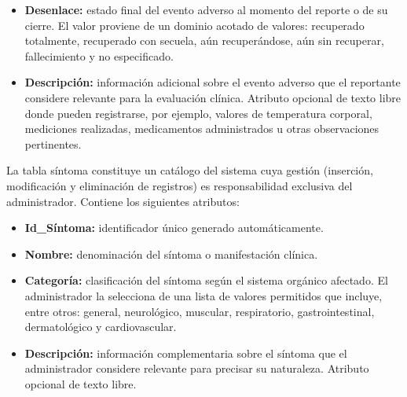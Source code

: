 \begin{itemize}
        \begin{itemize}
            \item Requirió visita médica.
            \item Requirió atención en servicios de emergencia.
            \item Requirió hospitalización.
            \item Provocó incapacidad temporal.
            \item Provocó la muerte del sujeto (en cuyo caso debe registrarse la fecha de fallecimiento).
            \item Provocó una anomalía congénita posiblemente relacionada con la vacunación.
        \end{itemize}
    \item \textbf{Desenlace:} estado final del evento adverso al momento del reporte o de su cierre. El valor proviene de un dominio acotado de valores: recuperado totalmente, recuperado con secuela, aún recuperándose, aún sin recuperar, fallecimiento y no especificado.
    \item \textbf{Descripción:} información adicional sobre el evento adverso que el reportante considere relevante para la evaluación clínica. Atributo opcional de texto libre donde pueden registrarse, por ejemplo, valores de temperatura corporal, mediciones realizadas, medicamentos administrados u otras observaciones pertinentes.
    
\end{itemize}

La tabla síntoma constituye un catálogo del sistema cuya gestión (inserción, modificación y eliminación de registros) es responsabilidad exclusiva del administrador. Contiene los siguientes atributos:

\begin{itemize}
    \item \textbf{Id\_Síntoma:} identificador único generado automáticamente.
    \item \textbf{Nombre:} denominación del síntoma o manifestación clínica.
    \item \textbf{Categoría:} clasificación del síntoma según el sistema orgánico afectado. El administrador la selecciona de una lista de valores permitidos que incluye, entre otros: general, neurológico, muscular, respiratorio, gastrointestinal, dermatológico y cardiovascular.
    \item \textbf{Descripción:} información complementaria sobre el síntoma que el administrador considere relevante para precisar su naturaleza. Atributo opcional de texto libre.
\end{itemize}


